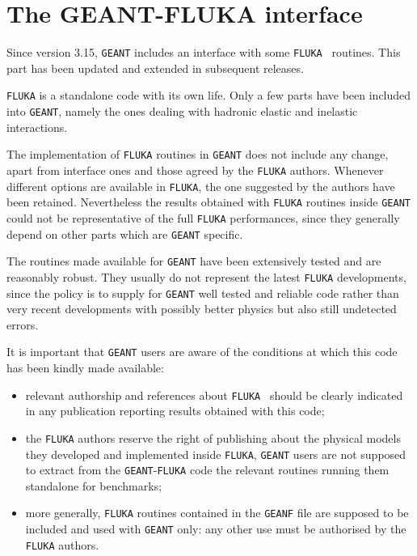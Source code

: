 \section{The GEANT-FLUKA interface}

Since version 3.15, {\tt GEANT} includes an interface with some
{\tt FLUKA}~\cite{bib-FLUK,bib-FLU1,bib-FLU2,bib-FLU3,bib-FLU4,bib-FLU5,bib-FLU6}
routines. This part has been updated and extended in subsequent releases.

{\tt FLUKA} is a standalone code with its own life. Only a few parts have been
included into {\tt GEANT}, namely the ones dealing with hadronic elastic and
inelastic interactions.

The implementation of {\tt FLUKA} routines in {\tt GEANT} does not include
any change, apart from interface ones and those agreed by the {\tt FLUKA}
authors. Whenever different options are available in {\tt FLUKA}, the one
suggested by the authors have been retained. Nevertheless the results
obtained with {\tt FLUKA} routines inside {\tt GEANT} could not be 
representative of the full {\tt FLUKA} performances, since they
generally depend on other parts which are {\tt GEANT} specific.

The routines made available for {\tt GEANT} have been extensively tested and are
reasonably robust. They usually do not represent the latest {\tt FLUKA}
developments, since the policy is to supply for {\tt GEANT} well tested
and reliable code rather than very recent developments with possibly better
physics but also still undetected errors.

It is important that {\tt GEANT} users are aware of the conditions at which
this code has been kindly made available:
\begin{itemize}
\item relevant authorship and references about 
{\tt FLUKA}~\cite{bib-FLUK,bib-FLU1,bib-FLU2,bib-FLU3,bib-FLU4,bib-FLU5,bib-FLU6}
should be clearly
indicated in any publication reporting results obtained with this code;
\item the {\tt FLUKA} authors reserve the right of publishing about 
the physical models
they developed and implemented inside {\tt FLUKA}, {\tt GEANT} users are not 
supposed to extract from the {\tt GEANT}-{\tt FLUKA} code the relevant
routines running them standalone for benchmarks;
\item more generally,
{\tt FLUKA} routines contained in the {\tt GEANF} file are supposed to be
included and used with {\tt GEANT} only: any other use must be authorised
by the {\tt FLUKA} authors.
\end{itemize}

